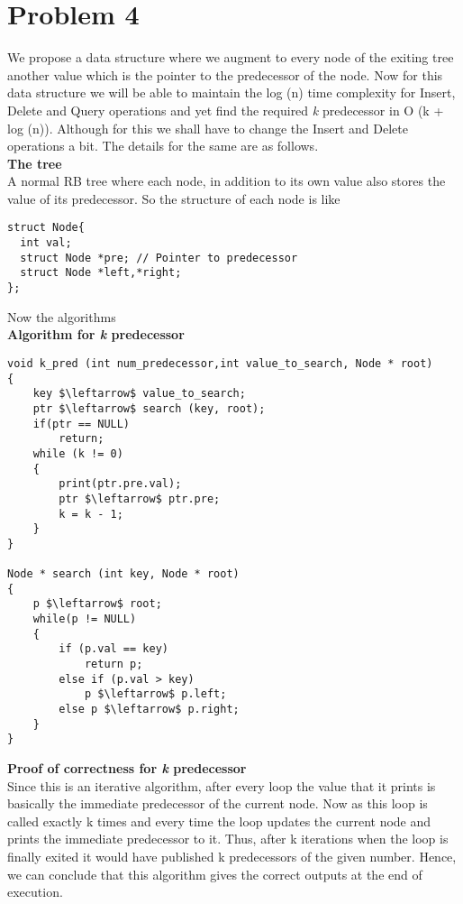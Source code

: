 \documentclass[a4paper,11pt]{article}
\theoremstyle{mytheor}
\begin{document}
\section*{Problem 4}
We propose a data structure where we augment to every node of the exiting tree another value which is the pointer to the predecessor of the node. Now for this data structure we will be able to maintain the log (n) time complexity for Insert, Delete and Query operations and yet find the required \textit{k} predecessor in  O (k + log (n)). Although for this we shall have to change the Insert and Delete operations a bit. The details for the same are as follows.\\
\textbf{The tree}\\
A normal RB tree where each node, in addition to its own value also stores the value of its predecessor. So the structure of each node is like\\
\begin{lstlisting}[label={list:first},caption=Node Structure.]
struct Node{
  int val;
  struct Node *pre;	// Pointer to predecessor
  struct Node *left,*right;  
};
\end{lstlisting}
\pagebreak
Now the algorithms\\
\textbf{Algorithm for \textit{k} predecessor}\\
\begin{lstlisting}[label={list:first},caption=k predecessor, mathescape = true]
void k_pred (int num_predecessor,int value_to_search, Node * root)
{
	key $\leftarrow$ value_to_search;
	ptr $\leftarrow$ search (key, root);
	if(ptr == NULL)
		return;
	while (k != 0)
	{
		print(ptr.pre.val);
		ptr $\leftarrow$ ptr.pre;
		k = k - 1;	
	}
}

Node * search (int key, Node * root)
{
	p $\leftarrow$ root;
	while(p != NULL)
	{
		if (p.val == key)
			return p;
		else if (p.val > key)
			p $\leftarrow$ p.left;
		else p $\leftarrow$ p.right;
	}
}
\end{lstlisting}
\textbf{Proof of correctness for \textit{k} predecessor}\\
Since this is an iterative algorithm, after every loop the value that it prints is basically the immediate predecessor of the current node. Now as this loop is called exactly k times and every time the loop updates the current node and prints the immediate predecessor to it. Thus, after k iterations when the loop is finally exited it would have published k predecessors of the given number.
Hence, we can conclude that this algorithm gives the correct outputs at the end of execution.\\
\end{document}

